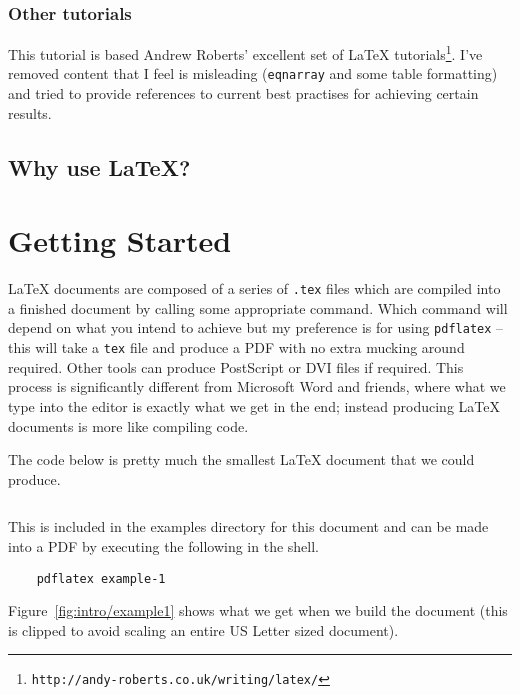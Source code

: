   \subsubsection{Other tutorials}

  This tutorial is based Andrew Roberts' excellent set of LaTeX tutorials\footnote{\texttt{http://andy-roberts.co.uk/writing/latex/}}.
  I've removed content that I feel is misleading (\texttt{eqnarray} and some table formatting) and tried to provide references to current best practises for achieving certain results.

  \subsection{Why use LaTeX?}

  \section{Getting Started}

  LaTeX documents are composed of a series of \texttt{.tex} files which are compiled into a finished document by calling some appropriate command.
  Which command will depend on what you intend to achieve but my preference is for using \texttt{pdflatex} -- this will take a \texttt{tex} file and produce a PDF with no extra mucking around required.
  Other tools can produce PostScript or DVI files if required.
  This process is significantly different from Microsoft Word and friends, where what we type into the editor is exactly what we get in the end; instead producing LaTeX documents is more like compiling code.

  The code below is pretty much the smallest LaTeX document that we could produce.

  \inputminted{tex}{examples/example-1.tex}

  This is included in the examples directory for this document and can be made into a PDF by executing the following in the shell.

  \begin{verbatim}
    pdflatex example-1
  \end{verbatim}

  Figure~\ref{fig:intro/example1} shows what we get when we build the document (this is clipped to avoid scaling an entire US Letter sized document).

